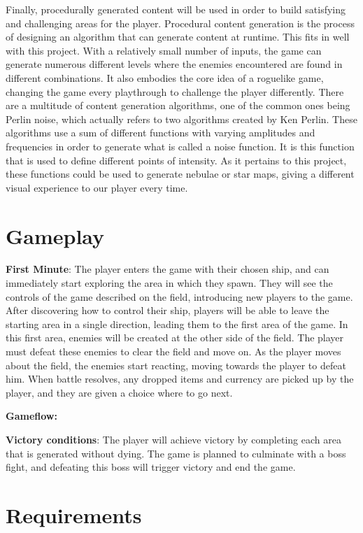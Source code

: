 \documentclass[12pt]{article}       %
\begin{document}
	Finally, procedurally generated content will be used in order to build satisfying and challenging areas for the player. Procedural content generation is the process of designing an algorithm that can generate content at runtime. This fits in well with this project. With a relatively small number of inputs, the game can generate numerous different levels where the enemies encountered are found in different combinations. It also embodies the core idea of a roguelike game, changing the game every playthrough to challenge the player differently. There are a multitude of content generation algorithms, one of the common ones being Perlin noise, which actually refers to two algorithms created by Ken Perlin. These algorithms use a sum of different functions with varying amplitudes and frequencies in order to generate what is called a noise function. It is this function that is used to define different points of intensity. As it pertains to this project, these functions could be used to generate nebulae or star maps, giving a different visual experience to our player every time. \cite{PCG}


\section{Gameplay} %
\label{sec:Gameplay}

{\bf First Minute}: The player enters the game with their chosen ship, and can immediately start exploring the area in which they spawn. They will see the controls of the game described on the field, introducing new players to the game. After discovering how to control their ship, players will be able to leave the starting area in a single direction, leading them to the first area of the game. In this first area, enemies will be created at the other side of the field. The player must defeat these enemies to clear the field and move on. As the player moves about the field, the enemies start reacting, moving towards the player to defeat him. When battle resolves, any dropped items and currency are picked up by the player, and they are given a choice where to go next.

{\bf Gameflow:}


{\bf Victory conditions}: The player will achieve victory by completing each area that is generated without dying. The game is planned to culminate with a boss fight, and defeating this boss will trigger victory and end the game.

\section{Requirements} %
\label{sec:Requirements}
\end{document}
